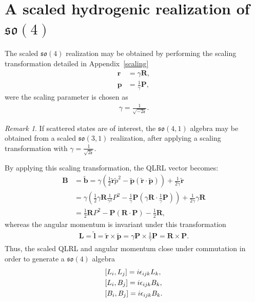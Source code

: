 \documentclass[12pt,a4paper]{report}
\theoremstyle{definition}
\theoremstyle{remark}
\newtheorem*{remark}{Remark}
\theoremstyle{remark}
\begin{document}
\section{A scaled hydrogenic realization of $\mathfrak{so}(4)$}
The scaled $\mathfrak{so}(4)$ realization may be obtained by performing the scaling transformation detailed in Appendix~\ref{scaling}
\begin{align*}
\textbf{r}&=\gamma \textbf{R},\\
\textbf{p}&=\frac{1}{\gamma}\textbf{P},
\end{align*}
were the scaling parameter is chosen as
\begin{align*}
\gamma=\frac{1}{\sqrt{-2\mathfrak{e}}}.
\end{align*}
\begin{remark}
If scattered states are of interest, the $\mathfrak{so}(4,1)$ algebra may be obtained from a scaled $\mathfrak{so}(3,1)$ realization, after applying a scaling transformation with $\gamma=\frac{1}{\sqrt{2\mathfrak{e}}}$.
\end{remark}
By applying this scaling transformation, the QLRL vector becomes:
\begin{equation}\label{eso4scaled.1}
\begin{aligned}
\textbf{B}&=\widetilde{\textbf{b}}=\gamma\left(\frac{1}{2}\widetilde{\textbf{r}}\widetilde{p}^2-\widetilde{\textbf{p}}(\widetilde{\textbf{r}}\cdot \widetilde{\textbf{p}})\right)+\frac{1}{2\gamma}\widetilde{\textbf{r}}\\
&=\gamma\left(\frac{1}{2}\gamma\textbf{R}\frac{1}{\gamma^2}P^2-\frac{1}{\gamma}\textbf{P}\left(\gamma \textbf{R}\cdot \frac{1}{\gamma}\textbf{P}\right)\right)+\frac{1}{2\gamma}\gamma\textbf{R}\\
&= \frac{1}{2}\textbf{R}P^2-\textbf{P}(\textbf{R}\cdot\textbf{P})-\frac{1}{2}\textbf{R},
\end{aligned}
\end{equation}
whereas the angular momentum is invariant under this transformation
\begin{align*}
\textbf{L}=\widetilde{\textbf{l}}=\widetilde{\textbf{r}}\times\widetilde{\textbf{p}}=\gamma\textbf{P}\times\frac{1}{\gamma}\textbf{P}=\textbf{R}\times\textbf{P}.
\end{align*}
Thus, the scaled QLRL and angular momentum close under commutation in order to generate a $\mathfrak{so}(4)$ algebra
\begin{equation}\label{eso41.1}
\begin{aligned}\relax
&[L_i,L_j]=i\epsilon_{ijk}L_k, \\
&[L_i,B_j]=i\epsilon_{ijk}B_k, \\
&[B_i,B_j]=i\epsilon_{ijk}B_k.
\end{aligned}
\end{equation}
\end{document}
